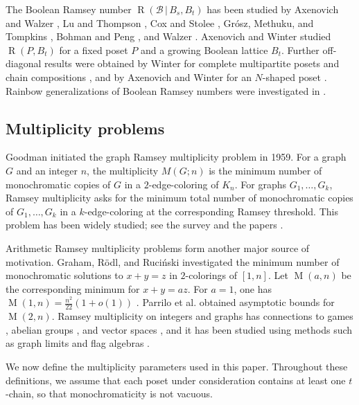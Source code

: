 \documentclass[twoside,12pt]{article}
\begin{document}
The Boolean Ramsey number $\operatorname{R}(\mathcal B\,|\,B_s,B_t)$ has been studied by Axenovich and Walzer \cite{AW17}, Lu and Thompson \cite{LT22}, Cox and Stolee \cite{CS18}, Gr\'osz, Methuku, and Tompkins \cite{GMT17,GMT23}, Bohman and Peng \cite{BP2021}, and Walzer \cite{Walzer15}. Axenovich and Winter \cite{AW23} studied $\operatorname{R}(P,B_t)$ for a fixed poset $P$ and a growing Boolean lattice $B_t$. Further off-diagonal results were obtained by Winter for complete multipartite posets \cite{Winter23} and chain compositions \cite{WinterIII}, and by Axenovich and Winter for an $N$-shaped poset \cite{WinterII}. Rainbow generalizations of Boolean Ramsey numbers were investigated in \cite{CGLMNPV22,CCLL20,KMOWY26,Patkos20,Patkos26}.

\subsection{Multiplicity problems}

Goodman \cite{Goodman59} initiated the graph Ramsey multiplicity problem in 1959. For a graph $G$ and an integer $n$, the multiplicity $M(G;n)$ is the minimum number of monochromatic copies of $G$ in a $2$-edge-coloring of $K_n$. For graphs $G_1,\dots,G_k$, Ramsey multiplicity asks for the minimum total number of monochromatic copies of $G_1,\dots,G_k$ in a $k$-edge-coloring at the corresponding Ramsey threshold. This problem has been widely studied; see the survey \cite{BR80} and the papers \cite{CFSW22,CFSW23,Fox08,JST96}.

Arithmetic Ramsey multiplicity problems form another major source of motivation. Graham, R\"odl, and Ruci\'nski \cite{GRR96} investigated the minimum number of monochromatic solutions to $x+y=z$ in $2$-colorings of $[1,n]$. Let $\operatorname{M}(a,n)$ be the corresponding minimum for $x+y=az$. For $a=1$, one has $\operatorname{M}(1,n)=\frac{n^2}{22}(1+o(1))$ \cite{RZ98,S99,D03}. Parrilo et al. \cite{PRS08} obtained asymptotic bounds for $\operatorname{M}(2,n)$. Ramsey multiplicity on integers and graphs has connections to games \cite{Harary82}, abelian groups \cite{SW16}, and vector spaces \cite{RS23}, and it has been studied using methods such as graph limits and flag algebras \cite{MN23,PPSS22}.

We now define the multiplicity parameters used in this paper. Throughout these definitions, we assume that each poset under consideration contains at least one $t$-chain, so that monochromaticity is not vacuous.
\end{document}
